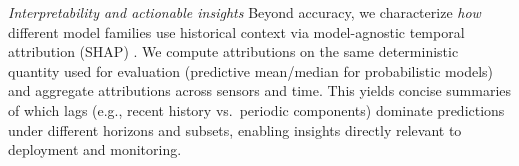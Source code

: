 \documentclass[10pt]{article}
\begin{document}
\textit{Interpretability and actionable insights}
\label{sec:insights}
Beyond accuracy, we characterize \emph{how} different model families use historical context via
model-agnostic temporal attribution (SHAP) \cite{lundberg2017shap}. We compute attributions on the same
deterministic quantity used for evaluation (predictive mean/median for probabilistic models) and
aggregate attributions across sensors and time. This yields concise summaries of which lags (e.g., recent
history vs.\ periodic components) dominate predictions under different horizons and subsets, enabling
insights directly relevant to deployment and monitoring.





\end{document}
